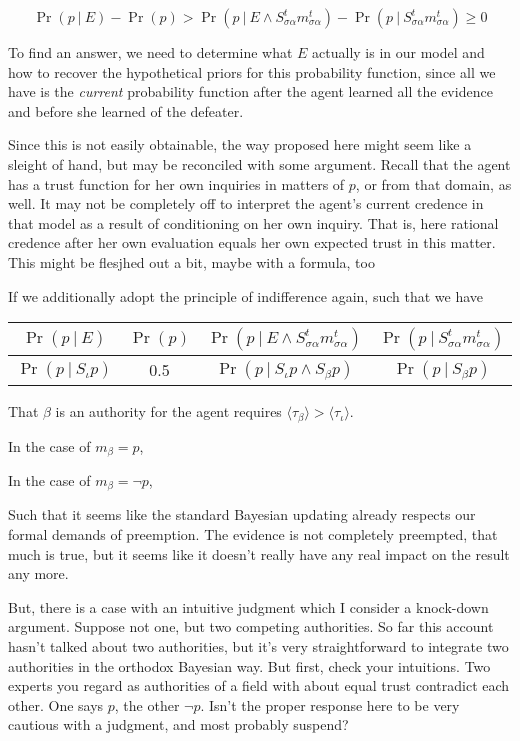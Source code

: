 \documentclass[11pt, a4paper]{scrartcl}
\newcommand{\Stsa}{S^t_{\sigma\alpha}}
\newcommand{\sa}{{\sigma\alpha}}
\newcommand{\given}[1][]{\:#1\vert\:}
\newcommand{\Sm}{\Stsa{}m^t_{\sa}}
\renewcommand{\i}[1]{\emph{#1}}
\begin{document}
\[
    \Pr(p \given E) - \Pr(p) > \Pr(p \given E \land \Sm) - \Pr(p \given \Sm) \geqslant 0
\]

To find an answer, we need to determine what $E$ actually is in our model and how to recover the hypothetical priors for this probability function, since all we have is the \i{current} probability function after the agent learned all the evidence and before she learned of the defeater. 

Since this is not easily obtainable, the way proposed here might seem like a sleight of hand, but may be reconciled with some argument. Recall that the agent has a trust function for her own inquiries in matters of $p$, or from that domain, as well. It may not be completely off to interpret the agent's current credence in that model as a result of conditioning on her own inquiry. That is, here rational credence after her own evaluation equals her own expected trust in this matter. {\color{red} This might be flesjhed out a bit, maybe with a formula, too}

If we additionally adopt the principle of indifference again, such that  we have

\begin{table}[ht]
\centering
\begin{tabular}{@{}cccc@{}}
\toprule
$\Pr(p \given E)$ & $\Pr(p)$ & $\Pr(p \given E \land \Sm)$ & $\Pr(p \given \Sm)$ \\ \midrule
$\Pr(p \given S_{\iota}p )$ & 0.5 & $\Pr(p \given S_\iota p \land S_\beta p)$ & $\Pr(p \given S_\beta p)$
\end{tabular}
\end{table}

That $\beta$ is an authority for the agent requires $\langle \tau_\beta \rangle > \langle \tau_\iota \rangle$.

In the case of $m_\beta = p$,  

In the case of $m_\beta = \neg p$, 

Such that it seems like the standard Bayesian updating already respects our formal demands of preemption. The evidence is not completely preempted, that much is true, but it seems like it doesn't really have any real impact on the result any more.  

But, there is a case with an intuitive judgment which I consider a knock-down argument. Suppose not one, but two competing authorities. So far this account hasn't talked about two authorities, but it's very straightforward to integrate two authorities in the orthodox Bayesian way. But first, check your intuitions. Two experts you regard as authorities of a field with about equal trust contradict each other. One says $p$, the other $\neg p$. Isn't the proper response here to be very cautious with a judgment, and most probably suspend? 
\end{document}
